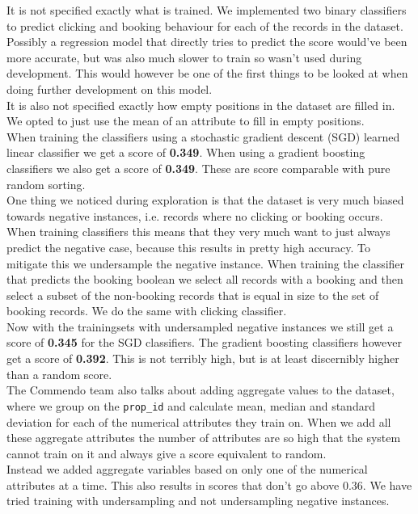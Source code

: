 \documentclass{llncs}
\begin{document}
It is not specified exactly what is trained. We implemented two binary classifiers to predict clicking and booking behaviour for each of the records in the dataset. Possibly a regression model that directly tries to predict the score would've been more accurate, but was also much slower to train so wasn't used during development. This would however be one of the first things to be looked at when doing further development on this model.\\
It is also not specified exactly how empty positions in the dataset are filled in. We opted to just use the mean of an attribute to fill in empty positions.\\
When training the classifiers using a stochastic gradient descent (SGD) learned linear classifier we get a score of \textbf{0.349}. When using a gradient boosting classifiers we also get a score of \textbf{0.349}. These are score comparable with pure random sorting. \\
One thing we noticed during exploration is that the dataset is very much biased towards negative instances, i.e. records where no clicking or booking occurs. When training classifiers this means that they very much want to just always predict the negative case, because this results in pretty high accuracy. To mitigate this we undersample the negative instance. When training the classifier that predicts the booking boolean we select all records with a booking and then select a subset of the non-booking records that is equal in size to the set of booking records. We do the same with clicking classifier.\\
Now with the trainingsets with undersampled negative instances we still get a score of \textbf{0.345} for the SGD classifiers. The gradient boosting classifiers however get a score of \textbf{0.392}. This is not terribly high, but is at least discernibly higher than a random score.\\
The Commendo team also talks about adding aggregate values to the dataset, where we group on the \verb!prop_id! and  calculate mean, median and standard deviation for each of the numerical attributes they train on. When we add all these aggregate attributes the number of attributes are so high that the system cannot train on it and always give a score equivalent to random.\\
Instead we added aggregate variables based on only one of the numerical attributes at a time. This also results in scores that don't go above 0.36. We have tried training with undersampling and not undersampling negative instances.
\pagebreak
\end{document}
